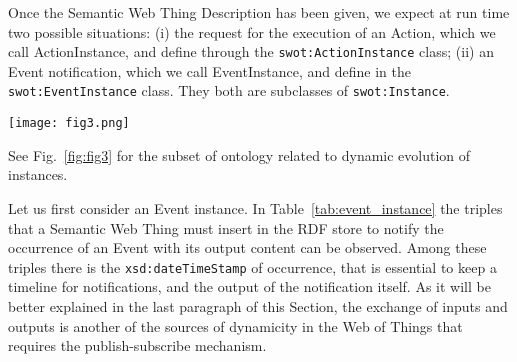 Once the Semantic Web Thing Description has been given, we expect at run time two possible situations: (i) the request for the execution of an Action, which we call ActionInstance, and define through the \texttt{swot:ActionInstance} class; (ii) an Event notification, which we call EventInstance, and define in the \texttt{swot:EventInstance} class. They both are subclasses of \texttt{swot:Instance}. 

\begin{figure*}
\centering
\texttt{[image: fig3.png]}
\caption{\texttt{swot:Instance} subset of the ontology, i.e., how the subgraph for an action request must be formatted, as well as how an Event notification is thrown.}
\label{fig:fig3}
\end{figure*}
See Fig.~\ref{fig:fig3} for the subset of ontology related to dynamic evolution of instances.

Let us first consider an Event instance. In Table~\ref{tab:event_instance} the triples that a Semantic Web Thing must insert in the RDF store to notify the occurrence of an Event with its output content can be observed. Among these triples there is the \texttt{xsd:dateTimeStamp} of occurrence, that is essential to keep a timeline for notifications, and the output of the notification itself. As it will be better explained in the last paragraph of this Section, the exchange of inputs and outputs is another of the sources of dynamicity in the Web of Things that requires the publish-subscribe mechanism.

